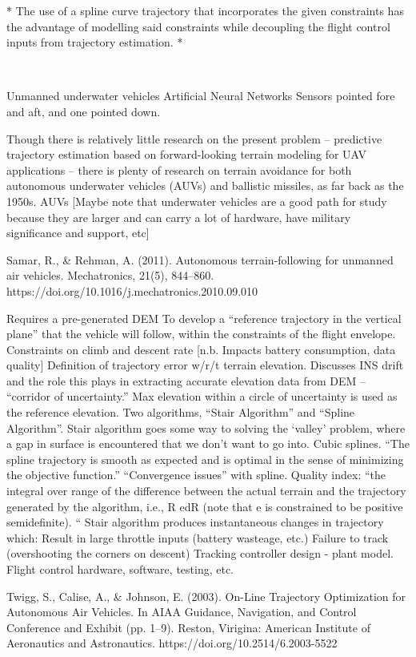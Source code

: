 * The use of a spline curve trajectory that incorporates the given constraints has the advantage of modelling said constraints while decoupling the flight control inputs from trajectory estimation. *


~~~

Unmanned underwater vehicles
Artificial Neural Networks
Sensors pointed fore and aft, and one pointed down.

Though there is relatively little research on the present problem -- predictive trajectory estimation based on forward-looking terrain modeling for UAV applications -- there is plenty of research on terrain avoidance for both autonomous underwater vehicles (AUVs) and ballistic missiles, as far back as the 1950s. 
AUVs
[Maybe note that underwater vehicles are a good path for study because they are larger and can carry a lot of hardware, have military significance and support, etc]

\cite{Samar2011}
Samar, R., \& Rehman, A. (2011). Autonomous terrain-following for unmanned air vehicles. Mechatronics, 21(5), 844–860. https://doi.org/10.1016/j.mechatronics.2010.09.010

Requires a pre-generated DEM
To develop a “reference trajectory in the vertical plane” that the vehicle will follow, within the constraints of the flight envelope.
Constraints on climb and descent rate [n.b. Impacts battery consumption, data quality]
Definition of trajectory error w/r/t terrain elevation.
Discusses INS drift and the role this plays in extracting accurate elevation data from DEM -- “corridor of uncertainty.”
Max elevation within a circle of uncertainty is used as the reference elevation.
Two algorithms, “Stair Algorithm” and “Spline Algorithm”.
Stair algorithm goes some way to solving the ‘valley’ problem, where a gap in surface is encountered that we don’t want to go into.
Cubic splines.
“The spline trajectory is smooth as expected and is optimal in the sense of minimizing the objective function.”
“Convergence issues” with spline.
Quality index: “the integral over range of the difference between the actual terrain and the trajectory generated by the algorithm, i.e., R edR (note that e is constrained to be positive semidefinite). “
Stair algorithm produces instantaneous changes in trajectory which:
Result in large throttle inputs (battery wasteage, etc.)
Failure to track (overshooting the corners on descent)
Tracking controller design - plant model.
Flight control hardware, software, testing, etc.

\cite{Twigg2003}
Twigg, S., Calise, A., \& Johnson, E. (2003). On-Line Trajectory Optimization for Autonomous Air Vehicles. In AIAA Guidance, Navigation, and Control Conference and Exhibit (pp. 1–9). Reston, Virigina: American Institute of Aeronautics and Astronautics. https://doi.org/10.2514/6.2003-5522

